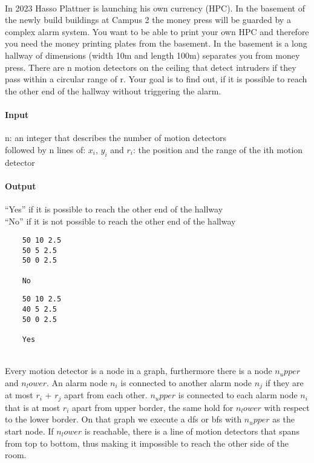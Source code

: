 



\makeheader

\\
In 2023 Hasso Plattner is launching his own currency (HPC). In the basement of the newly build buildings at Campus 2 the money press will be guarded by a complex alarm system. 
You want to be able to print your own HPC and therefore you need the money printing plates from the basement. 
In the basement is a long hallway of dimensions (width 10m and length 100m) separates you from money press. There are n motion detectors on the ceiling that detect intruders if they pass within a circular range of r. 
Your goal is to find out, if it is possible to reach the other end of the hallway without triggering the alarm. 

\paragraph*{Input}
n: an integer that describes the number of motion detectors \\
followed by n lines of:
$x_i$, $y_i$ and $r_i$: the position and the range of the ith motion detector


\paragraph*{Output}
“Yes” if it is possible to reach the other end of the hallway \\
“No” if it is not possible to reach the other end of the hallway


\begin{samples}
  \begin{verbatim}
    50 10 2.5
    50 5 2.5
    50 0 2.5 
    
    No   
  \end{verbatim}
    

    
  \begin{verbatim}
    50 10 2.5
    40 5 2.5
    50 0 2.5 
    
    Yes  
  \end{verbatim}
\end{samples}

\\
Every motion detector is a node in a graph, furthermore there is a node $n_upper$ and $n_lower$. 
An alarm node $n_i$ is connected to another alarm node $n_j$ if they are at most $r_i$ + $r_j$ apart from each other. 
$n_upper$ is connected to each alarm node $n_i$ that is at most $r_i$ apart from upper border, the same hold for $n_lower$ with respect to the lower border. 
On that graph we execute a dfs or bfs with $n_upper$ as the start node. If $n_lower$ is reachable, there is a line of motion detectors that spans from top to bottom, thus making it impossible to reach the other side of the room.

